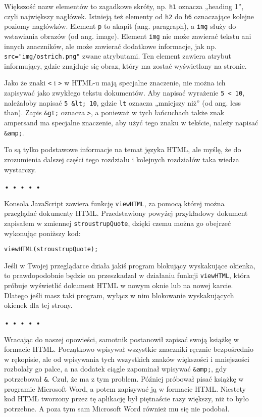   
Większość nazw elementów to zagadkowe skróty, np. \texttt{h1} oznacza „heading 1”, czyli największy nagłówek. Istnieją też elementy od \texttt{h2} do \texttt{h6} oznaczające kolejne poziomy nagłówków. Element \texttt{p} to akapit (ang. paragraph), a \texttt{img} służy do wstawiania obrazów (od ang. image). Element \texttt{img} nie może zawierać tekstu ani innych znaczników, ale może zawierać dodatkowe informacje, jak np. \texttt{src="img/ostrich.png"} zwane atrybutami. Ten element zawiera atrybut informujący, gdzie znajduje się obraz, który ma zostać wyświetlony na stronie.

  
Jako że znaki \texttt{<} i \texttt{>} w HTML-u mają specjalne znaczenie, nie można ich zapisywać jako zwykłego tekstu dokumentów. Aby napisać wyrażenie \texttt{5 < 10}, należałoby napisać \texttt{5 \&lt; 10}, gdzie \texttt{lt} oznacza „mniejszy niż” (od ang. less than). Zapis \texttt{\&gt;} oznacza \texttt{>}, a ponieważ w tych łańcuchach także znak ampersand ma specjalne znaczenie, aby użyć tego znaku w tekście, należy napisać \texttt{\&amp;}.

  
To są tylko podstawowe informacje na temat języka HTML, ale myślę, że do zrozumienia dalszej części tego rozdziału i kolejnych rozdziałów taka wiedza wystarczy.



\begin{center}
• • • • •
\end{center}

  
Konsola JavaScript zawiera funkcję \texttt{viewHTML}, za pomocą której można przeglądać dokumenty HTML. Przedstawiony powyżej przykładowy dokument zapisałem w zmiennej \texttt{stroustrupQuote}, dzięki czemu można go obejrzeć wykonując poniższy kod:

  
\begin{verbatim} 
viewHTML(stroustrupQuote);
 \end{verbatim}
  
Jeśli w Twojej przeglądarce działa jakiś program blokujący wyskakujące okienka, to prawdopodobnie będzie on przeszkadzał w działaniu funkcji \texttt{viewHTML}, która próbuje wyświetlić dokument HTML w nowym oknie lub na nowej karcie. Dlatego jeśli masz taki program, wyłącz w nim blokowanie wyskakujących okienek dla tej strony.



\begin{center}
• • • • •
\end{center}

  
Wracając do naszej opowieści, samotnik postanowił zapisać swoją książkę w formacie HTML. Początkowo wpisywał wszystkie znaczniki ręcznie bezpośrednio w rękopisie, ale od wpisywania tych wszystkich znaków większości i mniejszości rozbolały go palce, a na dodatek ciągle zapominał wpisywać \texttt{\&amp;}, gdy potrzebował \texttt{\&}. Czuł, że ma z tym problem. Później próbował pisać książkę w programie Microsoft Word, a potem zapisywać ją w formacie HTML. Niestety kod HTML tworzony przez tę aplikację był piętnaście razy większy, niż to było potrzebne. A poza tym sam Microsoft Word również mu się nie podobał.

